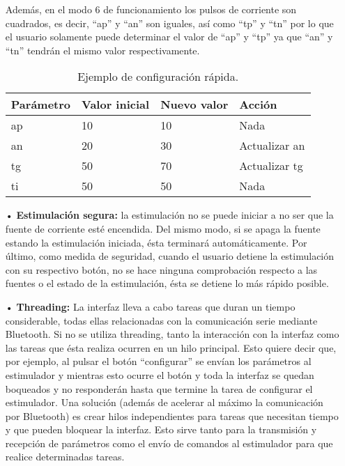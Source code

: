 \begin{itemize}
Además, en el modo 6 de funcionamiento los pulsos de corriente son cuadrados, es decir, ``ap'' y ``an'' son iguales, así como ``tp'' y ``tn'' por lo que el usuario solamente puede determinar el valor de ``ap'' y ``tp'' ya que ``an'' y ``tn'' tendrán el mismo valor respectivamente.

\begin{table}[!htb]
\centering
\begin{tabular}{| p{30mm} | p{30 mm} | p{30 mm} | p{30 mm} |}
\hline
\textbf{Parámetro} & \textbf{Valor inicial} & \textbf{Nuevo valor} & \textbf{Acción} \\ \hline
ap & 10 & 10 & Nada\\ \hline
an & 20 & 30 & Actualizar an \\ \hline
tg & 50 & 70 & Actualizar tg\\ \hline
ti & 50 & 50 & Nada\\ \hline
\end{tabular}\caption{Ejemplo de configuración rápida.}\label{cuadro:configuracion_rapida}
\end{table}

\item[•] \textbf{Estimulación segura:} la estimulación no se puede iniciar a no ser que la fuente de corriente esté encendida. Del mismo modo, si se apaga la fuente estando la estimulación iniciada, ésta terminará automáticamente. Por último, como medida de seguridad, cuando el usuario detiene la estimulación con su respectivo botón, no se hace ninguna comprobación respecto a las fuentes o el estado de la estimulación, ésta se detiene lo más rápido posible.

\item[•] \textbf{Threading: } La interfaz lleva a cabo tareas que duran un tiempo considerable, todas ellas relacionadas con la comunicación serie mediante Bluetooth. Si no se utiliza threading, tanto la interacción con la interfaz como las tareas que ésta realiza ocurren en un hilo principal. Esto quiere decir que, por ejemplo, al pulsar el botón ``configurar'' se envían los parámetros al estimulador y mientras esto ocurre el botón y toda la interfaz se quedan boqueados y no responderán hasta que termine la tarea de configurar el estimulador. Una solución (además de acelerar al máximo la comunicación por Bluetooth) es crear hilos independientes para tareas que necesitan tiempo y que pueden bloquear la interfaz. Esto sirve tanto para la transmisión y recepción de parámetros como el envío de comandos al estimulador para que realice determinadas tareas.


\end{itemize}
